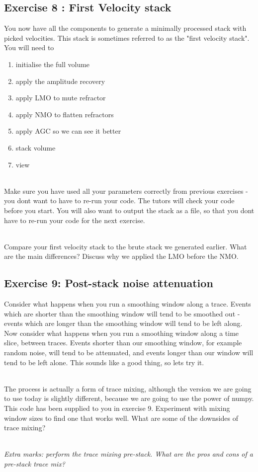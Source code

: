 \subsection*{Exercise 8 : First Velocity stack}
You now have all the components to generate a minimally processed stack with picked velocities.  This stack is sometimes referred to as the "first velocity stack".  You will need to
\begin{enumerate}
\item initialise the full volume
\item apply the amplitude recovery
\item apply LMO to mute refractor
\item apply NMO to flatten refractors
\item apply AGC so we can see it better
\item stack volume
\item view
\end{enumerate}
\par~\\
Make sure you have used all your parameters correctly from previous exercises - you dont want to have to re-run your code.  The tutors will check your code before you start.  You will also want to output the stack as a file, so that you dont have to re-run your code for the next exercise.
\par~\\
Compare your first velocity stack to the brute stack we generated earlier. What are the main differences?  Discuss why we applied the LMO before the NMO.

\subsection*{Exercise 9: Post-stack noise attenuation}
Consider what happens when you run a smoothing window along a trace.  Events which are shorter than the smoothing window will tend to be smoothed out - events which are longer than the smoothing window will tend to be left along. Now consider what happens when you run a smoothing window along a time slice, between traces.  Events shorter than our smoothing window, for example random noise, will tend to be attenuated, and events longer than our window will tend to be left alone. This sounds like a good thing, so lets try it.
\par~\\
The process is actually a form of trace mixing, although the version we are going to use today is slightly different, because we are going to use the power of numpy. This code has been supplied to you in exercise 9. Experiment with mixing window sizes to find one that works well.  What are some of the downsides of trace mixing?
\par~\\
\emph{Extra marks: perform the trace mixing pre-stack.  What are the pros and cons of a pre-stack trace mix?}



